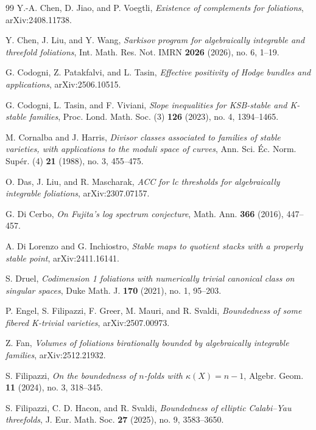 \documentclass[11pt,reqno]{amsart}
\numberwithin{equation}{section}
\theoremstyle{definition}
\begin{document}
\begin{thebibliography}{99}
 Y.-A. Chen, D. Jiao, and P. Voegtli, \textit{Existence of complements for foliations}, arXiv:2408.11738.

 Y. Chen, J. Liu, and Y. Wang, \textit{Sarkisov program for algebraically integrable and threefold foliations}, Int. Math. Res. Not. IMRN \textbf{2026} (2026), no. 6, 1--19.

 G. Codogni, Z. Patakfalvi, and L. Tasin, \textit{Effective positivity of Hodge bundles and applications}, arXiv:2506.10515.

 G. Codogni, L. Tasin, and F. Viviani, \textit{Slope inequalities for KSB-stable and K-stable families}, Proc. Lond. Math. Soc. (3) \textbf{126} (2023), no. 4, 1394--1465.

 M. Cornalba and J. Harris, \textit{Divisor classes associated to families of stable varieties, with applications to the moduli space of curves}, Ann. Sci. \'Ec. Norm. Sup\'er. (4) \textbf{21} (1988), no. 3, 455--475.

 O. Das, J. Liu, and R. Mascharak, \textit{ACC for lc thresholds for algebraically integrable foliations}, arXiv:2307.07157.

 G. Di Cerbo, \textit{On Fujita's log spectrum conjecture}, Math. Ann. \textbf{366} (2016), 447--457.

 A. Di Lorenzo and G. Inchiostro, \textit{Stable maps to quotient stacks with a properly stable point}, arXiv:2411.16141.

 S. Druel, \textit{Codimension 1 foliations with numerically trivial canonical class on singular spaces}, Duke Math. J. \textbf{170} (2021), no. 1, 95--203.

 P. Engel, S. Filipazzi, F. Greer, M. Mauri, and R. Svaldi, \textit{Boundedness of some fibered K-trivial varieties}, arXiv:2507.00973.

 Z. Fan, \textit{Volumes of foliations birationally bounded by algebraically integrable families}, arXiv:2512.21932.

 S. Filipazzi, \textit{On the boundedness of $n$-folds with $\kappa(X)=n-1$}, Algebr. Geom. \textbf{11} (2024), no. 3, 318--345.

 S. Filipazzi, C. D. Hacon, and R. Svaldi, \textit{Boundedness of elliptic Calabi--Yau threefolds}, J. Eur. Math. Soc. \textbf{27} (2025), no. 9, 3583--3650.


\end{thebibliography}
\end{document}
